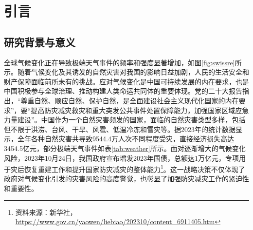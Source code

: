 \chapter{引言}
\section{研究背景与意义}
全球气候变化正在导致极端天气事件的频率和强度显著增加，如图\ref{fig:swissre}所示。随着气候变化及其诱发的自然灾害对我国的影响日益加剧，人民的生活安全和财产保障面临前所未有的挑战。应对气候变化是中国可持续发展的内在要求，也是中国积极参与全球治理、推动构建人类命运共同体的重要体现。党的二十大报告指出，“尊重自然、顺应自然、保护自然，是全面建设社会主义现代化国家的内在要求”，要“提高防灾减灾救灾和重大突发公共事件处置保障能力，加强国家区域应急力量建设”。中国作为一个自然灾害频发的国家，面临的自然灾害类型多样，包括但不限于洪涝、台风、干旱、风雹、低温冷冻和雪灾等。据2023年的统计数据显示，全年各种自然灾害共导致9544.4万人次不同程度受灾，直接经济损失高达3454.5亿元，部分极端天气事件如表\ref{tab:weather}所示。面对逐渐增大的气候变化风险，2023年10月24日，我国政府宣布增发2023年国债，总额达1万亿元，专项用于灾后恢复重建工作和提升国家防灾减灾的整体能力\footnote{资料来源：新华社，\url{https://www.gov.cn/yaowen/liebiao/202310/content_6911405.htm}}。这一战略决策不仅体现了政府对气候变化引发的灾害风险的高度警觉，也彰显了加强防灾减灾工作的紧迫性和重要性。

